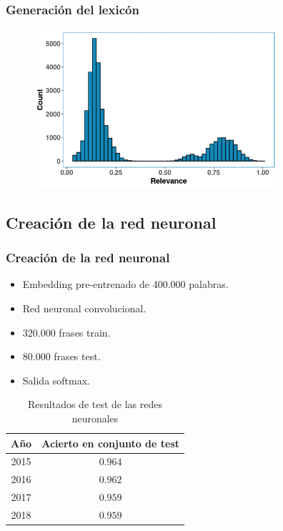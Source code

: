 \documentclass[10pt,fleqn]{beamer}
\begin{document}
\begin{frame} \frametitle{Generación del lexicón} 

\begin{figure}  \centering
  \includegraphics[width=9cm, keepaspectratio]{images/2018_hist.png}
\end{figure}
\end{frame}




\subsection{Creación de la red neuronal}
\begin{frame} \frametitle{Creación de la red neuronal} 
\begin{itemize}
\item Embedding pre-entrenado de 400.000 palabras.
\item Red neuronal convolucional.
\item 320.000 frases train.
\item 80.000 frases test.
\item Salida softmax.
\end{itemize}

\begin{table}[]
\begin{center}
\begin{tabular}{|c|c|}
\hline
\textbf{Año}       & \textbf{Acierto en conjunto de test} \\ \hline
2015      	& $0.964$                \\ \hline
2016        & $0.962$                 \\ \hline
2017 		& $0.959$                 \\ \hline
2018        & $0.959$                  \\ \hline
\end{tabular}
\caption{Resultados de test de las redes neuronales}
\label{tab:red_tests}
\end{center}
\end{table}

\end{frame}
\end{document}

